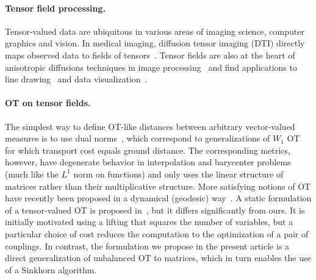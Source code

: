 \paragraph{Tensor field processing.}

Tensor-valued data are ubiquitous in various areas of imaging science, computer graphics and vision. In medical imaging, diffusion tensor imaging (DTI) directly maps observed data to fields of tensors~\cite{Dryden2009,Deriche2006}. Tensor fields are also at the heart of anisotropic diffusions techniques in image processing~\cite{weickert1998anisotropic} and find applications to line drawing~\cite{VaxmanCDPBHB16} and data visualization~\cite{HotzFHHJJ04}. 

\paragraph{OT on tensor fields.}

The simplest way to define OT-like distances between arbitrary vector-valued measures is to use dual norms~\cite{Ning2014metrics}, which correspond to generalizations of $W_1$ OT for which transport cost equals ground distance. The corresponding metrics, however, have degenerate behavior in interpolation and barycenter problems (much like the $L^1$ norm on functions) and only uses the linear structure of matrices rather than their multiplicative structure.
%
More satisfying notions of OT have recently been proposed in a dynamical (geodesic) way~\cite{JiangSpectral,Carlen2014,Chen2016}. 
%
A static formulation of a tensor-valued OT is proposed in~\cite{ning2015matrix}, but it differs significantly from ours. It is initially motivated using a lifting that squares the number of variables, but a particular choice of cost reduces the computation to the optimization of a pair of couplings. In contrast, the formulation we propose in the present article is a direct generalization of unbalanced OT to matrices, which in turn enables the use of a Sinkhorn algorithm. 





